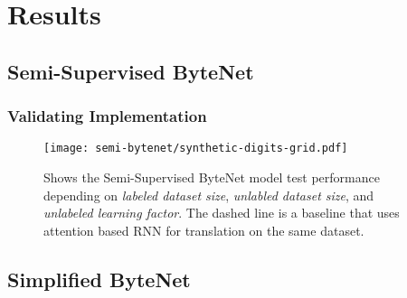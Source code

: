 \chapter{Results}


\clearpage


\clearpage

\section{Semi-Supervised ByteNet}

\subsection{Validating Implementation}
\begin{figure}[H]
    \centering
    \texttt{[image: semi-bytenet/synthetic-digits-grid.pdf]}
    \caption{Shows the Semi-Supervised ByteNet model test performance depending on \textit{labeled dataset size}, \textit{unlabled dataset size}, and \textit{unlabeled learning factor}. The dashed line is a baseline that uses attention based RNN for translation on the same dataset.}
\end{figure}

\clearpage
\section{Simplified ByteNet}
